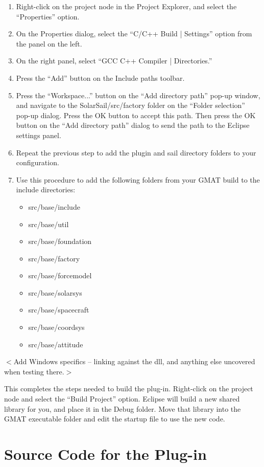 \documentclass[letterpaper,10pt]{article}
\begin{document}
\begin{enumerate}
\item Right-click on the project node in the Project Explorer, and select the ``Properties'' option.
\item On the Properties dialog, select the ``C/C++ Build | Settings'' option from the panel on the
left.
\item On the right panel, select ``GCC C++ Compiler | Directories.''
\item Press the ``Add'' button on the Include paths toolbar.
\item Press the ``Workspace...'' button on the ``Add directory path'' pop-up window, and navigate
to the SolarSail/src/factory folder on the ``Folder selection'' pop-up dialog.  Press the OK button
to accept this path. Then press the OK button on the ``Add directory path'' dialog to send the path
to the Eclipse settings panel.
\item Repeat the previous step to add the plugin and sail directory folders to your configuration.
\item Use this procedure to add the following folders from your GMAT build to the include
directories:
\begin{itemize}
\item src/base/include
\item src/base/util
\item src/base/foundation
\item src/base/factory
\item src/base/forcemodel
\item src/base/solarsys
\item src/base/spacecraft
\item src/base/coordsys
\item src/base/attitude
\end{itemize}
\end{enumerate}

$<$Add Windows specifics -- linking against the dll, and anything else uncovered when testing
there.$>$

This completes the steps needed to build the plug-in.  Right-click on the project node and select
the ``Build Project'' option.  Eclipse will build a new shared library for you, and place it in the
Debug folder.  Move that library into the GMAT executable folder and edit the startup file to use
the new code.

\section{\label{sec:SourceListing}Source Code for the Plug-in}
\end{document}
